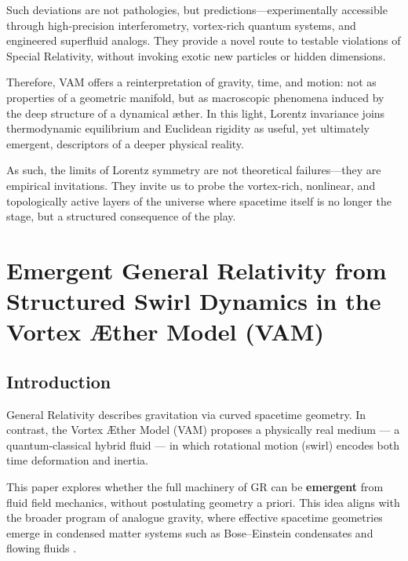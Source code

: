 \documentclass[12pt]{article}
\begin{document}
    Such deviations are not pathologies, but predictions—experimentally accessible through high-precision interferometry, vortex-rich quantum systems, and engineered superfluid analogs. They provide a novel route to testable violations of Special Relativity, without invoking exotic new particles or hidden dimensions.

    Therefore, VAM offers a reinterpretation of gravity, time, and motion: not as properties of a geometric manifold, but as macroscopic phenomena induced by the deep structure of a dynamical æther. In this light, Lorentz invariance joins thermodynamic equilibrium and Euclidean rigidity as useful, yet ultimately emergent, descriptors of a deeper physical reality.

    As such, the limits of Lorentz symmetry are not theoretical failures—they are empirical invitations. They invite us to probe the vortex-rich, nonlinear, and topologically active layers of the universe where spacetime itself is no longer the stage, but a structured consequence of the play.


\section*{Emergent General Relativity from Structured Swirl Dynamics in the Vortex Æther Model (VAM)}
    \subsection*{Introduction}

    General Relativity describes gravitation via curved spacetime geometry. In contrast, the Vortex Æther Model (VAM) proposes a physically real medium — a quantum-classical hybrid fluid — in which rotational motion (swirl) encodes both time deformation and inertia.

    This paper explores whether the full machinery of GR can be \textbf{emergent} from fluid field mechanics, without postulating geometry a priori.
This idea aligns with the broader program of analogue gravity, where effective spacetime geometries emerge in condensed matter systems such as Bose–Einstein condensates and flowing fluids \cite{barcelo2011analogue}.
\end{document}
